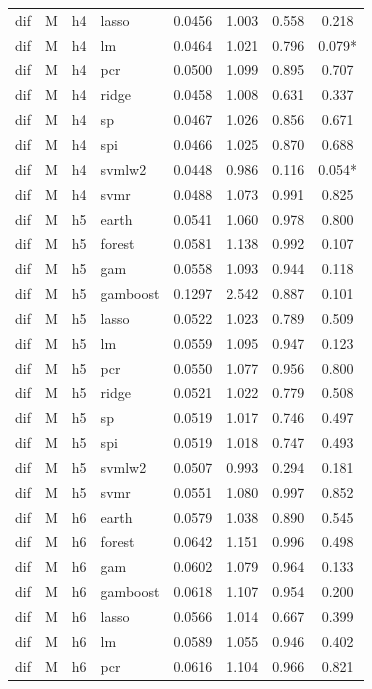 \begin{ThreePartTable}
\begin{longtable}[t]{llclcccc}
dif & M & h4 & lasso & 0.0456 & 1.003 & 0.558 & 0.218\\
dif & M & h4 & lm & 0.0464 & 1.021 & 0.796 & 0.079*\\
dif & M & h4 & pcr & 0.0500 & 1.099 & 0.895 & 0.707\\
dif & M & h4 & ridge & 0.0458 & 1.008 & 0.631 & 0.337\\
dif & M & h4 & sp & 0.0467 & 1.026 & 0.856 & 0.671\\
dif & M & h4 & spi & 0.0466 & 1.025 & 0.870 & 0.688\\
dif & M & h4 & svmlw2 & 0.0448 & 0.986 & 0.116 & 0.054*\\
dif & M & h4 & svmr & 0.0488 & 1.073 & 0.991 & 0.825\\
\addlinespace
dif & M & h5 & earth & 0.0541 & 1.060 & 0.978 & 0.800\\
dif & M & h5 & forest & 0.0581 & 1.138 & 0.992 & 0.107\\
dif & M & h5 & gam & 0.0558 & 1.093 & 0.944 & 0.118\\
dif & M & h5 & gamboost & 0.1297 & 2.542 & 0.887 & 0.101\\
dif & M & h5 & lasso & 0.0522 & 1.023 & 0.789 & 0.509\\
dif & M & h5 & lm & 0.0559 & 1.095 & 0.947 & 0.123\\
dif & M & h5 & pcr & 0.0550 & 1.077 & 0.956 & 0.800\\
dif & M & h5 & ridge & 0.0521 & 1.022 & 0.779 & 0.508\\
dif & M & h5 & sp & 0.0519 & 1.017 & 0.746 & 0.497\\
dif & M & h5 & spi & 0.0519 & 1.018 & 0.747 & 0.493\\
dif & M & h5 & svmlw2 & 0.0507 & 0.993 & 0.294 & 0.181\\
dif & M & h5 & svmr & 0.0551 & 1.080 & 0.997 & 0.852\\
\addlinespace
dif & M & h6 & earth & 0.0579 & 1.038 & 0.890 & 0.545\\
dif & M & h6 & forest & 0.0642 & 1.151 & 0.996 & 0.498\\
dif & M & h6 & gam & 0.0602 & 1.079 & 0.964 & 0.133\\
dif & M & h6 & gamboost & 0.0618 & 1.107 & 0.954 & 0.200\\
dif & M & h6 & lasso & 0.0566 & 1.014 & 0.667 & 0.399\\
dif & M & h6 & lm & 0.0589 & 1.055 & 0.946 & 0.402\\
dif & M & h6 & pcr & 0.0616 & 1.104 & 0.966 & 0.821\\

\end{longtable}
\end{ThreePartTable}
